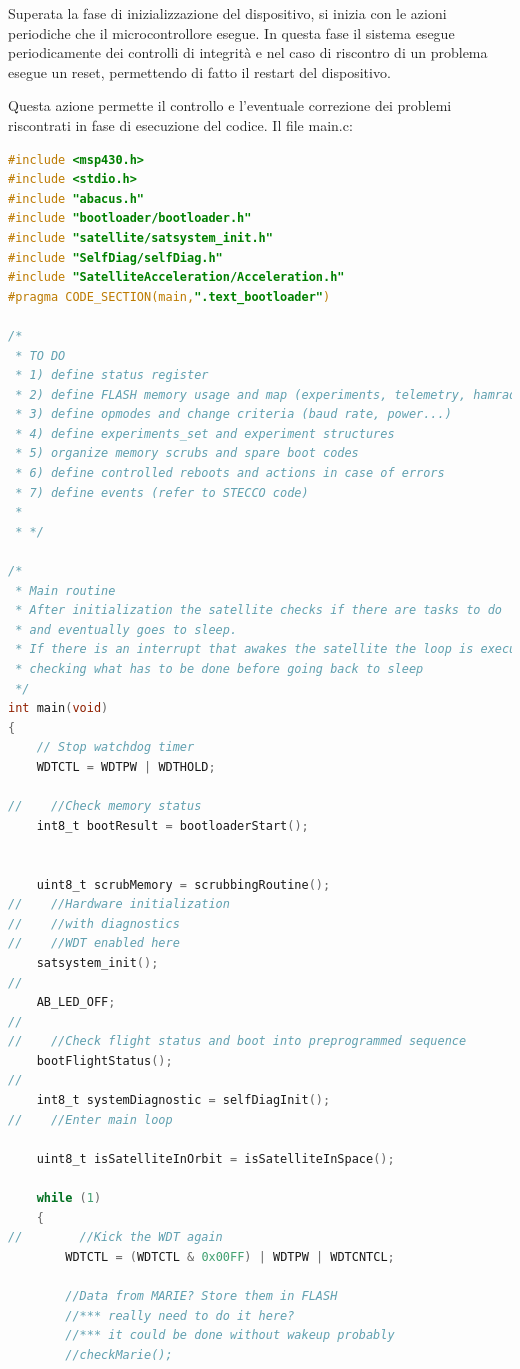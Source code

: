 \documentclass[LaM,binding=0.6cm]{../sapthesis}
\begin{document}
Superata la fase di inizializzazione del dispositivo, si inizia con le azioni periodiche che il microcontrollore esegue. In questa fase il sistema esegue periodicamente dei controlli di integrità e nel caso di riscontro di un problema esegue un reset, permettendo di fatto il restart del dispositivo. 

Questa azione permette il controllo e l'eventuale correzione dei problemi riscontrati in fase di esecuzione del codice.
\newline\newline
Il file main.c:

\begin{small}
\begin{lstlisting}[language=C]
#include <msp430.h>
#include <stdio.h>
#include "abacus.h"
#include "bootloader/bootloader.h"
#include "satellite/satsystem_init.h"
#include "SelfDiag/selfDiag.h"
#include "SatelliteAcceleration/Acceleration.h"
#pragma CODE_SECTION(main,".text_bootloader")

/*
 * TO DO
 * 1) define status register
 * 2) define FLASH memory usage and map (experiments, telemetry, hamradio...)
 * 3) define opmodes and change criteria (baud rate, power...)
 * 4) define experiments_set and experiment structures
 * 5) organize memory scrubs and spare boot codes
 * 6) define controlled reboots and actions in case of errors
 * 7) define events (refer to STECCO code)
 *
 * */

/*
 * Main routine
 * After initialization the satellite checks if there are tasks to do 
 * and eventually goes to sleep.
 * If there is an interrupt that awakes the satellite the loop is executed
 * checking what has to be done before going back to sleep
 */
int main(void)
{
    // Stop watchdog timer
    WDTCTL = WDTPW | WDTHOLD;

//    //Check memory status
    int8_t bootResult = bootloaderStart();


    uint8_t scrubMemory = scrubbingRoutine();
//    //Hardware initialization
//    //with diagnostics
//    //WDT enabled here
    satsystem_init();
//
    AB_LED_OFF;
//
//    //Check flight status and boot into preprogrammed sequence
    bootFlightStatus();
//
    int8_t systemDiagnostic = selfDiagInit();
//    //Enter main loop

    uint8_t isSatelliteInOrbit = isSatelliteInSpace();

    while (1)
    {
//        //Kick the WDT again
        WDTCTL = (WDTCTL & 0x00FF) | WDTPW | WDTCNTCL;

        //Data from MARIE? Store them in FLASH
        //*** really need to do it here?
        //*** it could be done without wakeup probably
        //checkMarie();


\end{lstlisting}
\end{small}
\end{document}

